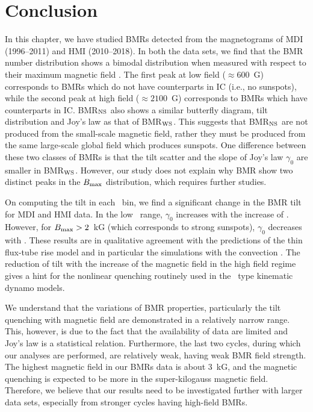 \section{Conclusion}
\label{ch6:conclusion}
In this chapter, we have studied BMRs detected from the magnetograms of
MDI (1996--2011) and HMI (2010--2018). In both the data sets, we find that the BMR number distribution
shows a bimodal distribution when measured with respect to their maximum magnetic field \Bmax.
The first peak at low field (\Bmax$\approx600$~G) corresponds to BMRs which do not have
counterparts in IC (i.e., no sunspots),
while the second peak at high field (\Bmax$\approx 2100$~G) corresponds to BMRs
which have counterparts in IC. BMR$_{\rm NS}$ also shows a similar butterfly diagram, tilt distribution and Joy's law
as that of BMR$_{\rm WS}$. This suggests that BMR$_{\rm NS}$ are not produced from the small-scale magnetic field, rather they must be produced from the same large-scale global field which produces sunspots.
One difference between these two classes of BMRs is that the tilt scatter and
the slope of Joy's law $\gamma_0$ are smaller in BMR$_{\rm WS}$. 
However, our study does not explain why BMR show two distinct peaks in the $B_{\rm max}$ distribution, which requires further studies.

On computing the tilt in each \Bmax\ bin, we find a significant change in the BMR tilt for MDI and HMI data.
In the low \Bmax\ range, $\gamma_0$ increases with the increase of \Bmax.
However, for $B_{\rm max} > 2$~kG (which corresponds to strong sunspots), $\gamma_0$ decreases with \Bmax. These results are in qualitative agreement with the predictions of the thin flux-tube rise 
model \citep{DSilva1993,Fan1994, Caligari1995, Fan2009}and in particular the simulations 
with the convection \citep{Weber2011, Weber2013}. The reduction of tilt with the increase of the magnetic field 
in the high field regime gives a hint for the nonlinear quenching routinely used in the \bl\ type kinematic dynamo models.

We understand that the variations of BMR properties, particularly the tilt quenching with magnetic field are demonstrated in a relatively narrow range. This, however, is due to the fact that the availability of data are limited and Joy's law is a statistical relation. Furthermore, the last two cycles, during which our analyses are performed, are relatively weak, having weak BMR field strength. The highest magnetic field in our BMRs data is about 3~kG, and the magnetic quenching is expected to be more in the super-kilogauss magnetic field. Therefore, we believe that our results need to be investigated further with larger data sets, especially from stronger cycles having high-field BMRs.









